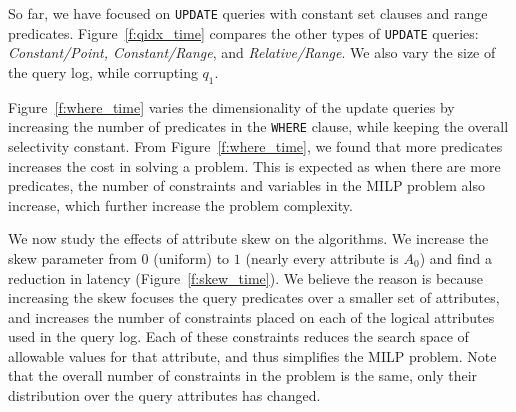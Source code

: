 So far, we have focused on \texttt{UPDATE} queries with constant set clauses and range predicates.  Figure~\ref{f:qidx_time} compares the other types of \texttt{UPDATE} queries: 
{\it Constant/Point, Constant/Range}, and {\it Relative/Range}. We also vary the size of the query log, while corrupting $q_1$.

Figure~\ref{f:where_time} varies the dimensionality of the update queries by increasing the number of predicates in the \texttt{WHERE} clause, while keeping the overall selectivity constant.
From Figure~\ref{f:where_time}, we found that more predicates increases the cost in solving a problem. 
This is expected as when there are more predicates, the number of constraints and variables in the MILP problem also increase, which further increase the problem complexity.


 We now study the effects of attribute skew on the algorithms.
We increase the skew parameter from $0$ (uniform) to $1$ (nearly every attribute is $A_0$) 
and find a reduction in latency (Figure~\ref{f:skew_time}).
We believe the reason is because increasing the skew focuses the query predicates over a smaller set of attributes, 
and increases the number of constraints placed on each of the logical attributes used in the query log.  
Each of these constraints reduces the search space of allowable values for that attribute, and thus simplifies the MILP problem.
Note that the overall number of constraints in the problem is the same, only their distribution over the query attributes has changed.

